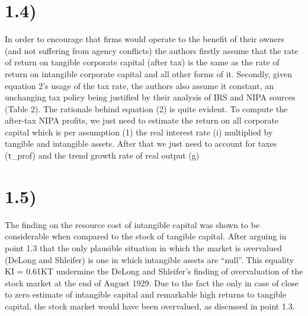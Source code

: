 \documentclass[11pt, oneside]{article}   	%
\begin{document}
\section*{1.4)}
In order to encourage that firms would operate to the benefit of their owners (and not suffering from agency conflicts) the authors firstly assume that the rate of return on tangible corporate capital (after tax) is the same as the rate of return on intangible corporate capital and all other forms of it. Secondly, given equation 2’s usage of the tax rate, the authors also assume it constant, an unchanging tax policy being justified by their analysis of IRS and NIPA sources (Table 2). The rationale behind equation (2) is quite evident. To compute the after-tax NIPA profits, we just need to estimate the return on all corporate capital which is per assumption (1) the real interest rate (i) multiplied by tangible and intangible assets. After that we just need to account for taxes (τ_prof) and the trend growth rate of real output (g) 
	

\section*{1.5)}
The finding on the resource cost of intangible capital was shown to be considerable when compared to the stock of tangible capital. After arguing in point 1.3 that the only plausible situation in which the market is overvalued (DeLong and Shleifer) is one in which intangible assets are “null”. This equality KI = 0.61KT undermine the DeLong and Shleifer’s finding of overvaluation of the stock market at the end of August 1929. Due to the fact the only in case of close to zero estimate of intangible capital and remarkable high returns to tangible capital, the stock market would have been overvalued, as discussed in point 1.3.


	
\end{document}

